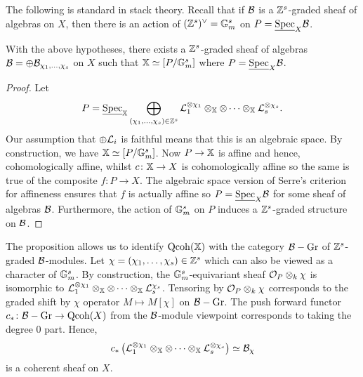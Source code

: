 \documentclass[12pt]{amsart}
\begin{document}
The following is standard in stack theory. Recall that if $\mathcal{B}$ is a $\mathbb{Z}^s$-graded sheaf of algebras on $X$, then there is an action of $(\mathbb{Z}^s)^{\vee} = \mathbb{G}_m^s$ on $P = \underline{\operatorname{Spec}}_X \mathcal{B}$. 
\begin{proposition}  \label{prop:XisPmodG}
With the above hypotheses, there exists a $\mathbb{Z}^s$-graded sheaf of algebras $\mathcal{B} = \oplus \mathcal{B}_{\chi_1,\ldots,\chi_s}$ on $X$ 
such that $\mathbb{X} \simeq [P/\mathbb{G}_m^s]$ where $P = \underline{\operatorname{Spec}}_X \mathcal{B}$. 
\end{proposition}
\begin{proof}
Let 
$$P = \underline{\operatorname{Spec}}_{\mathbb{X}} \bigoplus_{(\chi_1,\ldots,\chi_s)\in \mathbb{Z}^s} \mathcal{L}_1^{\otimes \chi_1} \otimes_{\mathbb{X}} \otimes \cdots \otimes_{\mathbb{X}} \mathcal{L}_s^{\otimes \chi_s}.$$
Our assumption that $\oplus \mathcal{L}_i$ is faithful means that this is an algebraic space. By construction, we have $\mathbb{X} \simeq [P/\mathbb{G}_m^s]$. Now $P \to \mathbb{X}$ is affine and hence, cohomologically affine, whilst $c \colon \mathbb{X} \to X$ is cohomologically affine so the same is true of the composite $f \colon P \to X$. The algebraic space version of Serre's criterion for affineness \cite[Proposition~3.3]{Alp} ensures that $f$ is actually affine so $P = \underline{\operatorname{Spec}}_X \mathcal{B}$ for some sheaf of algebras $\mathcal{B}$. Furthermore, the action of $\mathbb{G}_m^s$ on $P$ induces a $\mathbb{Z}^s$-graded structure on $\mathcal{B}$. 
\end{proof}
The proposition allows us to identify $\operatorname{Qcoh}(\mathbb{X})$ with the category $\mathcal{B}-\textup{Gr}$ of $\mathbb{Z}^s$-graded $\mathcal{B}$-modules. Let $\chi  = (\chi_1,\ldots,\chi_s) \in \mathbb{Z}^s$ which can also be viewed as a character of $\mathbb{G}_m^s$. By construction, the $\mathbb{G}_m^s$-equivariant sheaf $\mathcal{O}_P \otimes_k \chi$ is isomorphic to $\mathcal{L}_1^{\otimes \chi_1} \otimes_{\mathbb{X}} \otimes \cdots \otimes_{\mathbb{X}} \mathcal{L}_s^{\chi_s}$. Tensoring by $\mathcal{O}_P \otimes_k \chi$ corresponds to the graded shift by $\chi$ operator $M \mapsto M[\chi]$  on $\mathcal{B}-\textup{Gr}$. The push forward functor $c_* \colon \mathcal{B}-\textup{Gr} \to \operatorname{Qcoh}(X)$ from the $\mathcal{B}$-module viewpoint corresponds to taking the degree 0 part. Hence,
$$ c_* \left(\mathcal{L}_1^{\otimes \chi_1} \otimes_{\mathbb{X}} \otimes \cdots \otimes_{\mathbb{X}} \mathcal{L}_s^{\otimes \chi_s}\right) \simeq \mathcal{B}_{\chi} $$
is a coherent sheaf on $X$. 
\end{document}

